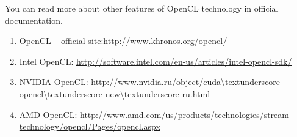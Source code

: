 {\begin{figure}[H]
		\label{OpenCLKernelExample:image}
	\end{figure}
	\sloppy You can read more about other features of OpenCL technology %
	in official documentation.
	\begin{enumerate}
		\sloppy
		\item OpenCL – official site:\url{http://www.khronos.org/opencl/}
		\item Intel OpenCL: \url{http://software.intel.com/en-us/articles/intel-opencl-sdk/}
		\item NVIDIA OpenCL: \url{http://www.nvidia.ru/object/cuda\textunderscore opencl\textunderscore new\textunderscore ru.html}
		\item AMD OpenCL: \url{http://www.amd.com/us/products/technologies/stream-technology/opencl/Pages/opencl.aspx}
	\end{enumerate}
}